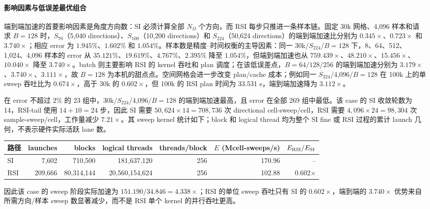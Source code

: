 \documentclass[10pt]{article}
\begin{document}


\paragraph{影响因素与低误差最优组合}

端到端加速的首要影响因素是角度方向数：SI 必须计算全部 $N_{\Omega}$ 个方向，而 RSI 每步只推进一条样本链。固定 30k 网格、4,096 样本和请求 $B=128$ 时，$S_{70}$（5,040 directions）、$S_{100}$（10,200 directions）和 $S_{224}$（50,624 directions）的端到端加速比分别为 $0.345\times$、$0.723\times$ 和 $3.740\times$；相应 error 为 $1.945\%$、$1.602\%$ 和 $1.054\%$。样本数是精度--时间权衡的主导因素：同一 30k/$S_{224}$/$B=128$ 下，8、64、512、1,024、4,096 样本的 error 从 $35.121\%$、$19.619\%$、$4.767\%$、$2.395\%$ 降至 $1.054\%$，但端到端加速也从 $759.439\times$、$48.210\times$、$15.456\times$、$10.040\times$ 降至 $3.740\times$。batch 则主要影响 RSI 的 kernel 吞吐和 plan 调度；在该低误差点，$B=64/128/256$ 的端到端加速分别为 $3.179\times$、$3.740\times$、$3.111\times$，故 $B=128$ 为本机的甜点点。空间网格会进一步改变 plan/cache 成本；例如同一 $S_{224}$/4,096/$B=128$ 在 100k 上的单 sweep 吞吐比为 $0.674\times$，高于 30k 的 $0.602\times$，但 100k 的 RSI plan 时间为 33.531 s，端到端加速降为 $3.112\times$。

在 error 不超过 $2\%$ 的 23 组中，30k/$S_{224}$/4,096/$B=128$ 的端到端加速最高，且 error 在全部 269 组中最低。该 case 的 SI 收敛轮数为 14，RSI-tail 使用 $14+10=24$ 步，因此 SI 需要 $50,624\times14=708,736$ 次 directional cell-sweep/cell，RSI 需要 $4,096\times24=98,304$ 次 sample-sweep/cell，工作量减少 $7.21\times$。其 sweep kernel 统计如下；block 和 logical thread 均为整个 SI fine 或 RSI 过程的累计 launch 几何，不表示硬件实际活跃 lane 数。

{\scriptsize\setlength{\tabcolsep}{3.3pt}
\begin{tabular}{lrrrrrr}
\toprule
路径 & launches & blocks & logical threads & threads/block & $E$ (Mcell-sweeps/s) & $E_{\rm RSI}/E_{\rm SI}$\\
\midrule
SI & 7,602 & 710,500 & 181,637,120 & 256 & 170.96 & --\\
RSI & 209,666 & 80,314,144 & 20,560,154,624 & 256 & 102.88 & 0.602$\times$\\
\bottomrule
\end{tabular}}

因此该 case 的 sweep 阶段实际加速为 $151.190/34.846=4.338\times$；RSI 的单位 sweep 吞吐只有 SI 的 $0.602\times$，端到端的 $3.740\times$ 优势来自所需方向/样本 sweep 数显著减少，而不是 RSI 单个 kernel 的并行吞吐更高。
\end{document}
